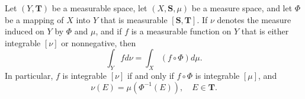 Let $(Y, \mathbf{T})$ be a measurable space, let $(X, \mathbf{S}, \mu)$ be a measure space, and let $\Phi$ be a mapping of $X$ into $Y$ that is measurable $[\mathbf{S}, \mathbf{T}]$. If $\nu$ denotes the measure induced on $Y$ by $\Phi$ and $\mu$, and if $f$ is a measurable function on $Y$ that is either integrable $[\nu]$ or nonnegative, then
$$\int_Y f d\nu = \int_X (f \circ \Phi) d\mu.$$
In particular, $f$ is integrable $[\nu]$ if and only if $f \circ \Phi$ is integrable $[\mu]$, and
$$\nu(E) = \mu(\Phi^{-1}(E)), \quad E \in \mathbf{T}.$$
